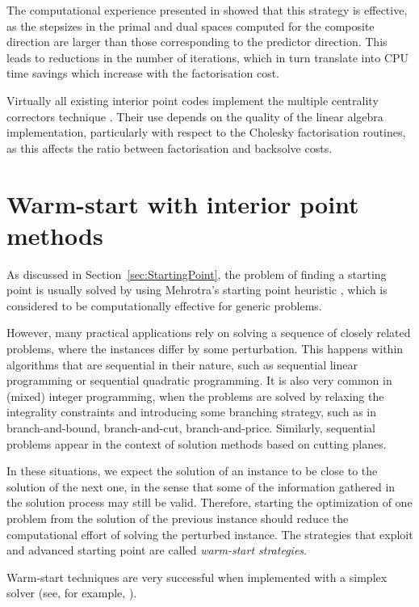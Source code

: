 The computational experience presented in \cite{Gondzio96} showed 
that this strategy is effective, as the stepsizes in the primal and 
dual spaces computed for the composite direction are larger than 
those corresponding to the predictor direction. 
This leads to reductions in the number of iterations, which in turn 
translate into CPU time savings which increase with the factorisation
cost.

Virtually all existing interior point codes implement the multiple
centrality correctors technique
\cite[Appendix B]{ipm:Wright97}.
Their use depends on the quality of the linear algebra implementation,
particularly with respect to the Cholesky factorisation routines,
as this affects the ratio between factorisation and backsolve costs.


%
%
\section{Warm-start with interior point methods}
\label{sec:WarmStart}

As discussed in Section~\ref{sec:StartingPoint}, the problem of 
finding a starting point is usually solved by using 
Mehrotra's starting point heuristic \cite{Mehrotra92}, which is 
considered to be computationally effective for generic problems.

However, many practical applications rely on solving a sequence 
of closely related problems, where the instances differ by some 
perturbation. This happens within algorithms that are sequential 
in their nature, such as sequential linear programming or
sequential quadratic programming.
It is also very common in (mixed) integer programming, when the
problems are solved by relaxing the integrality constraints and
introducing some branching strategy, such as in branch-and-bound,
branch-and-cut, branch-and-price.
Similarly, sequential problems appear in the context of solution 
methods based on cutting planes.

In these situations, we expect the solution of an instance to be 
close to the solution of the next one, in the sense that some of
the information gathered in the solution process may still be valid. 
Therefore, starting the 
optimization of one problem from the solution of the previous instance
should reduce the computational effort of solving the perturbed instance.
The strategies that exploit and advanced starting point are called
{\em warm-start strategies}.

Warm-start techniques are very successful 
when implemented with a simplex solver (see, for example, 
\cite{Bixby02}). 

